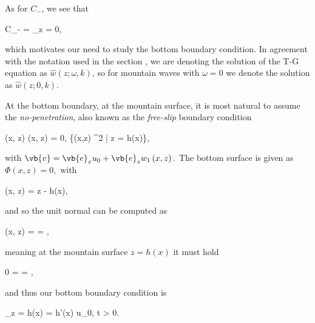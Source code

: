 \documentclass[../main.tex]{subfiles}
\begin{document}
As for $C_{-}$, we see that 

\begin{equations}[single,!, numberline=all]
	\label{eq:C-}
	C_- = _{z = 0},
\end{equations}

which motivates our need to study the bottom boundary condition. In agreement with the notation used in the section , we are denoting the solution of the T-G equation as $\hat{w}\left(z; \omega, k\right)$, so for mountain waves with $\omega = 0$ we denote the solution as $\hat{w}\left(z; 0, k\right)$.

At the bottom boundary, \ie at the mountain surface, it is most natural to assume the \emph{no-penetration}, also known as the \emph{free-slip} boundary condition 

\begin{equations}[single,*]
	\left(x, z\right) \cdot {}\left(x, z\right) = 0, \quad {} \quad \left\{\left(x,z\right) \in \R^2 \;\middle|\; z = h(x)\right\},
\end{equations}

with $\vb{v} = \vb{e}_x u_0 + \vb{e}_z w_1\left(x, z\right).$ The bottom surface is given as $\Phi\left(x, z\right) = 0, $ with 

\begin{equations}[single,*]
\Phi\left(x, z\right) = z - h(x),
\end{equations}

and so the unit normal can be computed as

\begin{equations}[single,*]
	\left(x, z\right) = \frac{\grad \Phi}{\abs{\grad \Phi}} = ,
\end{equations}

meaning at the mountain surface $z = h(x)$ it must hold

\begin{equations}[single,*]
0 =  \cdot {} = ,
\end{equations}

and thus our bottom boundary condition is

\begin{equations}[single,*]
	_{z = h(x)} = h'(x) u_0, t > 0.
\end{equations}
\end{document}
